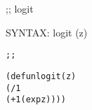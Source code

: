 \begin{aibox}{\function}
;; logit

SYNTAX: logit (z) 
\end{aibox}

\begin{aibox}{\examples}
\begin{alltt}
\end{alltt}

\end{aibox}

\begin{aibox}{\comments}

\end{aibox}
\begin{aibox}{\answers}

\end{aibox}
\begin{aibox}{\othercomments}

\end{aibox}
\begin{aibox}{\pseudocode}

\end{aibox}
\begin{aibox}{\code}

\begin{alltt}
;;%% code

(defun logit (z) 
    (/ 1
        (+ 1 (exp z))))

\end{alltt}
\end{aibox}
